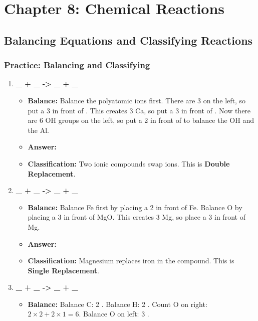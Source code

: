 \documentclass{article}
\begin{document}
\section*{Chapter 8: Chemical Reactions}

\subsection*{Balancing Equations and Classifying Reactions}
\subsubsection*{Practice: Balancing and Classifying}
\begin{enumerate}[itemsep=5pt]
    \item \textbf{\_  + \_  -> \_  + \_ }
    \begin{itemize}
        \item \textbf{Balance:} Balance the polyatomic ions first. There are 3  on the left, so put a 3 in front of . This creates 3 Ca, so put a 3 in front of . Now there are 6 OH groups on the left, so put a 2 in front of  to balance the OH and the Al.
        \item \textbf{Answer:} \textbf{}
        \item \textbf{Classification:} Two ionic compounds swap ions. This is \textbf{Double Replacement}.
    \end{itemize}
    \item \textbf{\_  + \_  -> \_  + \_ }
    \begin{itemize}
        \item \textbf{Balance:} Balance Fe first by placing a 2 in front of Fe. Balance O by placing a 3 in front of MgO. This creates 3 Mg, so place a 3 in front of Mg.
        \item \textbf{Answer:} \textbf{}
        \item \textbf{Classification:} Magnesium replaces iron in the compound. This is \textbf{Single Replacement}.
    \end{itemize}
    \item \textbf{\_  + \_  -> \_  + \_ }
    \begin{itemize}
        \item \textbf{Balance:} Balance C: 2 . Balance H: 2 . Count O on right: \(2 \times 2 + 2 \times 1 = 6\). Balance O on left: 3 .

\end{itemize}
\end{enumerate}
\end{document}
